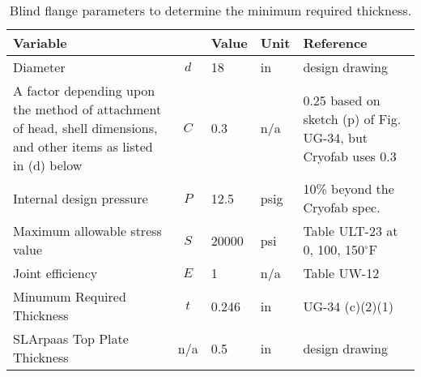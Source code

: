 \begin{table}[h]
\begin{center}
\tabcolsep=10pt
\begin{tabular}{>{\raggedleft}m{5cm}|c|l|l|m{5.5cm}}
\hline
\hline
Variable & & Value & Unit & Reference \\
\hline
Diameter & $d$ & 18 & in & design drawing \\
A factor depending upon the method of attachment of head, shell dimensions, 
and other items as listed in (d) below & $C$ & 
0.3 & n/a & 0.25 based on sketch (p) of Fig. UG-34, but Cryofab uses 0.3 \\
Internal design pressure & $P$ & 12.5 & psig & 10\% beyond the Cryofab spec. \\
Maximum allowable stress value & $S$ & 20000 & psi & Table ULT-23 at 0, 100, 150$^{\circ}$F \\
Joint efficiency & $E$ & 1 & n/a & Table UW-12 \\
\hline
Minumum Required Thickness & $t$ & 0.246 & in & UG-34 (c)(2)(1) \\
\hline
SLArpaas Top Plate Thickness & n/a & 0.5 & in & design drawing \\
\hline
\hline
\end{tabular}
\caption{Blind flange parameters to determine the minimum required thickness.}
\label{table:blind_flange}
\end{center}
\end{table}
